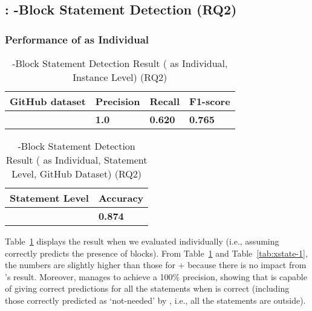 \subsection{{\xstate}: -Block Statement Detection (RQ2)}
\label{sec:rq2}

\subsubsection{Performance of {\xstate} as Individual}



\begin{table}[htpb]
\caption{-Block Statement Detection Result ({\xstate} as Individual, Instance Level) (RQ2)}
  \vspace{-12pt}
  \small
	\begin{center}
		\renewcommand{\arraystretch}{1}
		\begin{tabular}{| p{3.05cm}<{\centering} | p{1.2cm}<{\centering} | p{1.2cm}<{\centering}| p{1.2cm}<{\centering}|}
		  \hline
		GitHub dataset	  & Precision  & Recall & F1-score \\
			\hline
			\xstate  & \textbf{1.0}  &  \textbf{0.620} & \textbf{0.765}\\
			\hline
		\end{tabular}
		\label{tab:xstate-2}
	\end{center}
\end{table}

\begin{table}[t]
\caption{-Block Statement Detection Result ({\xstate} as Individual, Statement Level, GitHub Dataset) (RQ2)}
  \vspace{-12pt}
  \small
	\begin{center}
		\renewcommand{\arraystretch}{1}
		\begin{tabular}{| p{3.05cm}<{\centering} | p{1.2cm}<{\centering}|}
		  \hline
		Statement Level	  & Accuracy\\
			\hline
			\xstate  & \textbf{0.874}  \\
			\hline
		\end{tabular}
		\label{tab:xstate-4}
	\end{center}
\end{table}

Table~\ref{tab:xstate-2} displays the result when we evaluated
{\xstate} individually (i.e., assuming {\xblock} correctly predicts
the presence of  blocks). From
Table~\ref{tab:xstate-2} and Table~\ref{tab:xstate-1}, the numbers are
slightly higher than those for {\xblock}+ {\xstate} because there is no
impact from {\xblock}'s result. Moreover, {\xstate} manages to achieve
a 100\% precision, showing that {\xstate} is capable of giving correct
predictions for all the statements when {\xblock} is correct
(including those correctly predicted as `not-needed' by {\xblock},
i.e., all the statements are outside).


